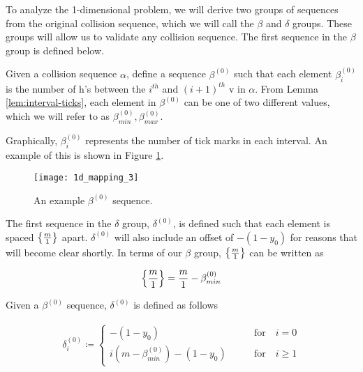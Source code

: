 
To analyze the 1-dimensional problem, we will derive two groups of sequences from the original collision sequence, which we will call the $\beta$ and $\delta$ groups. These groups will allow us to validate any collision sequence. The first sequence in the $\beta$ group is defined below.

\begin{definition}
	Given a collision sequence $\alpha$, define a sequence $\beta^{(0)}$ such that each element $\beta^{(0)}_i$ is the number of h's between the $i^{th}$ and $(i+1)^{th}$ v in $\alpha$. From Lemma \ref{lem:interval-ticks}, each element in $\beta^{(0)}$ can be one of two different values, which we will refer to as $\beta^{(0)}_{min}, \beta^{(0)}_{max}$.
\end{definition}

Graphically, $\beta^{(0)}_i$ represents the number of tick marks in each interval. An example of this is shown in Figure \ref{fig:beta-sequence}.

\begin{figure}[H]
  \begin{center}
    \texttt{[image: 1d\_mapping\_3]}
  \end{center}
  \vspace{-.2in} %
  \caption{\label{fig:beta-sequence} An example $\beta^{(0)}$ sequence.}
\end{figure}

The first sequence in the $\delta$ group, $\delta^{(0)}$, is defined such that each element is spaced $\cbracket{\frac{m}{1}}$ apart. $\delta^{(0)}$ will also include an offset of $-(1-y_0)$ for reasons that will become clear shortly. In terms of our $\beta$ group, $\cbracket{\frac{m}{1}}$ can be written as 

\begin{equation}
  \cbracket{\frac{m}{1}} = \frac{m}{1} - \beta^{(0)}_{min}
\end{equation}

\begin{definition}
  Given a $\beta^{(0)}$ sequence, $\delta^{(0)}$ is defined as follows

  \begin{align}\label{delta_0}
    \delta^{(0)}_i \coloneqq \begin{cases}
      -(1-y_0) \qquad &\text{for} \quad i = 0\\
      i (m - \beta^{(0)}_{min}) - (1-y_0) \qquad &\text{for} \quad i \ge 1
    \end{cases}
  \end{align}
\end{definition}


